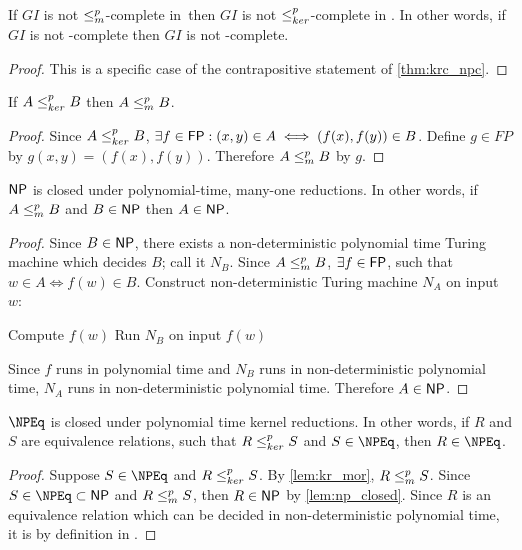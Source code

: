 \begin{corollary}\label{cor:gi_complete}If $GI$ is not $\leq^{p}_{m}$-complete in
  \NP\,then $GI$ is not $\leq^{p}_{ker}$-complete in \NPEq. In other words, if $GI$ is not
  \NP-complete then $GI$ is not \NPEq-complete.\end{corollary}
\begin{proof}
  This is a specific case of the contrapositive statement of
  \autoref{thm:krc_npc}.
\end{proof}

\begin{lemma}\label{lem:kr_mor}If $A\leq^{p}_{ker} B$ then $A\leq^{p}_{m} B$.\end{lemma}
\begin{proof}Since $A\leq^{p}_{ker} B$, $\exists f\in{\ensuremath{\mathsf{FP}}}: (x,y)\in A\iff(f(x), f(y))\in
  B$. Define $g\in FP$ by $g(x,y)=(f(x), f(y))$. Therefore $A\leq^{p}_{m} B$ by
  $g$.\end{proof}

\begin{lemma}\label{lem:np_closed}${\mathsf{NP}}$ is closed under polynomial-time,
  many-one reductions. In other words, if $A\leq^{p}_{m} B$ and $B\in{\ensuremath{\mathsf{NP}}}$ then
  $A\in{\ensuremath{\mathsf{NP}}}$.\end{lemma}
\begin{proof}
  Since $B\in{\ensuremath{\mathsf{NP}}}$, there exists a non-deterministic polynomial time Turing
  machine which decides $B$; call it $N_B$. Since $A\leq^{p}_{m} B$, $\exists f\in{\ensuremath{\mathsf{FP}}}$,
  such that $w\in A\iff f(w)\in B$. Construct non-deterministic Turing machine
  $N_A$ on input $w$:\\
  \begin{algorithm}[H]
    Compute $f(w)$\;
    Run $N_B$ on input $f(w)$\;
    \;
    \lElse{\REJECT}\;
  \end{algorithm}
  Since $f$ runs in polynomial time and $N_B$ runs in non-deterministic
  polynomial time, $N_A$ runs in non-deterministic polynomial time. Therefore
  $A\in{\ensuremath{\mathsf{NP}}}$.
\end{proof}

\begin{corollary}\label{cor:npeq_closed}$\NPEq$ is closed under polynomial time
  kernel reductions. In other words, if $R$ and $S$ are equivalence relations,
  such that $R\leq^{p}_{ker} S$ and $S\in\NPEq$, then $R\in\NPEq$.\end{corollary}
\begin{proof}Suppose $S\in\NPEq$ and $R\leq^{p}_{ker} S$. By \autoref{lem:kr_mor},
  $R\leq^{p}_{m} S$. Since $S\in\NPEq\subset\NP$ and $R\leq^{p}_{m} S$, then $R\in{\ensuremath{\mathsf{NP}}}$ by
  \autoref{lem:np_closed}. Since $R$ is an equivalence relation which can be
  decided in non-deterministic polynomial time, it is by definition in \NPEq.
\end{proof}

